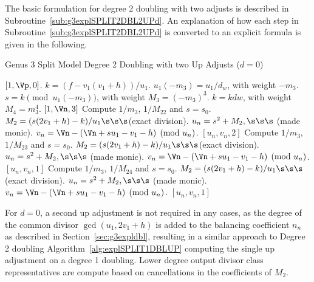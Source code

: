 The basic formulation for degree 2 doubling with two adjusts is described in
Subroutine~\ref{sub:g3explSPLIT2DBL2UPd}. An explanation of how each step in
Subroutine~\ref{sub:g3explSPLIT2DBL2UPd} is converted to an explicit formula is
given in the following.

\begin{algorithm}[htbp]
\caption{Genus 3 Split Model Degree 2 Doubling with two Up Adjusts ($d = 0$)\label{sub:g3explSPLIT2DBL2UPd}}
\begin{algorithmic} [1]
 \hspace{1pt} \Return $[1,\Vp,0]$.
\EndIf
\State $k = (f - v_1(v_1 + h))/u_1$.
\State $u_1(-m_3) = u_1/d_w$, with weight $-m_3$.
\State $s = k \pmod{u_1(-m_3)}$, with weight $M_3 = (-m_3)^3$.
\State $k = kdw$, with weight $M_4 = m_3^4$.
         \Return $[1,\Vn,3]$
        \Else \hspace{3pt} Compute $1/m_3$, $1/M_{22}$ and $s = s_0$.
            \State $M_2 = (s(2v_1 + h) - k)/u_1 \s\s\s $(exact division).
            \State $u_n = s^2 + M_2, \s\s\s $ (made monic).
            \State $v_n = \Vn - (\Vn + su_1 - v_1 - h) \pmod{u_n}$.
            \State \Return $[u_n,v_n,2]$
        \EndIf
    \Else \hspace{3pt} Compute $1/m_3$, $1/M_{23}$ and $s = s_0$.
        \State $M_2 = (s(2v_1 + h) - k)/u_1 \s\s\s $(exact division).
        \State $u_n = s^2 + M_2, \s\s\s $ (made monic).
        \State $v_n = \Vn - (\Vn + su_1 - v_1 - h) \pmod{u_n}$.
        \State \Return $[u_n,v_n,1]$
    \EndIf
\EndIf
\State Compute $1/m_3$, $1/M_{24}$ and $s = s_0$.
\State $M_2 = (s(2v_1 + h) - k)/u_1 \s\s\s $(exact division).
\State $u_n = s^2 + M_2, \s\s\s $ (made monic).
\State $v_n = \Vn - (\Vn + su_1 - v_1 - h) \pmod{u_n}$.
\State \Return $[u_n,v_n,1]$
\end{algorithmic}
\end{algorithm}
For $d=0$, a second up adjustment is not required in any cases, as the degree of
the common divisor $\gcd(u_1,2v_1 + h)$ is added to the balancing coefficient
$n_n$ as described in Section~\ref{sec:g3expldbl}, resulting in a similar
approach to Degree 2 doubling Algorithm~\ref{alg:explSPLIT1DBLUP} computing the
single up adjustment on a degree 1 doubling. Lower degree output divisor class
representatives are compute based on cancellations in the coefficients of $M_2$.

